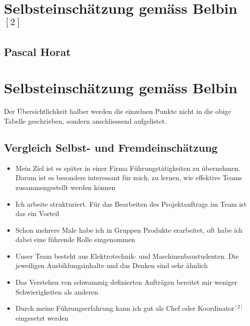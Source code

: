 \documentclass[11pt,twoside]{hsrthesis}
\begin{document}


\tableofcontents


%

% 

\chapter{Selbsteinschätzung gemäss Belbin $^{[2]}$}
\section{Pascal Horat}



\chapter{Selbsteinschätzung gemäss Belbin}

Der Übersichtlichkeit halber werden die einzelnen Punkte nicht in die obige Tabelle geschrieben, sondern anschliessend aufgelistet.

\section{Vergleich Selbst- und Fremdeinschätzung}
\begin{itemize}
\item Mein Ziel ist es später in einer Firma Führungstätigkeiten zu übernehmen. Darum ist es besonders interessant für mich, zu lernen, wie effektive Teams zusammengestellt werden können
\item Ich arbeite strukturiert. Für das Bearbeiten des Projektauftrags im Team ist das ein Vorteil
\item Schon mehrere Male habe ich in Gruppen Produkte erarbeitet, oft habe ich dabei eine führende Rolle eingenommen
\item Unser Team besteht aus Elektrotechnik- und Maschinenbaustudenten. Die jeweiligen Ausbildungsinhalte und das Denken sind sehr ähnlich 
\item Das Verstehen von schwammig definierten Aufträgen bereitet mir weniger Schwierigkeiten als anderen
\item Durch meine Führungserfahrung kann ich gut als Chef oder Koordinator$^{[2]}$ eingesetzt werden
\end{itemize}
\end{document}
